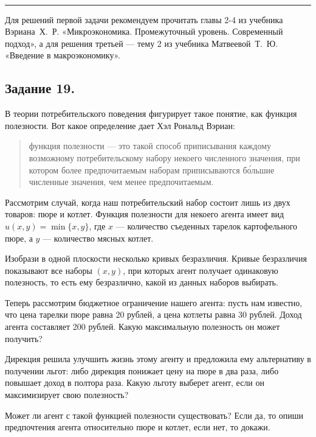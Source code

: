 \\
\rule[0.5\baselineskip]{\textwidth}{1pt}

\vspace{0\baselineskip}

\rule{0pt}{0pt}\hfill\parbox[t]{0.923\textwidth}{
{\it\small
\parskip=6pt\parindent=0pt

Для решений первой задачи рекомендуем прочитать главы 2-4 из учебника
Вэриана~Х.~Р. «Микроэкономика. Промежуточный уровень. Современный подход», а для решения третьей — тему 2 из учебника Матвеевой~Т.~Ю. «Введение в макроэкономику».
}
}
\vspace{1\baselineskip}


\subsection*{Задание 19.}
В теории потребительского поведения фигурирует такое понятие, как функция полезности. Вот какое определение дает Хэл Рональд Вэриан: 

\begin{quote}
функция полезности — это такой способ приписывания каждому возможному потребительскому набору некоего численного значения, при котором более предпочитаемым наборам приписываются б\'{о}льшие численные значения, чем менее предпочитаемым.
\end{quote}

Рассмотрим случай, когда наш потребительский набор состоит лишь из двух товаров: пюре и котлет. Функция полезности для некоего агента имеет вид $u(x,y)=\min\{x, y\}$, где $x$ — количество съеденных тарелок картофельного пюре, а $y$ — количество мясных котлет.
\begin{list}{)}{\leftmargin=6mm  \topsep=0mm  \itemsep=0pt \parsep=0mm \itemindent=-1pt}
\item Изобрази в одной плоскости несколько кривых безразличия. Кривые безразличия показывают все наборы $(x,y)$, при которых агент получает одинаковую полезность, то есть ему безразлично, какой из данных наборов выбирать.
\item Теперь рассмотрим бюджетное ограничение нашего агента: пусть нам известно, что цена тарелки пюре равна 20 рублей, а цена котлеты равна 30 рублей. Доход агента составляет 200 рублей. Какую максимальную полезность он может получить?
\item Дирекция решила улучшить жизнь этому агенту и предложила ему альтернативу в получении льгот: либо дирекция понижает цену на пюре в два раза, либо повышает доход в полтора раза. Какую льготу выберет агент, если он максимизирует свою полезность?
\item Может ли агент с такой функцией полезности существовать? Если да, то опиши предпочтения агента относительно пюре и котлет, если нет, то докажи.
\end{list}

